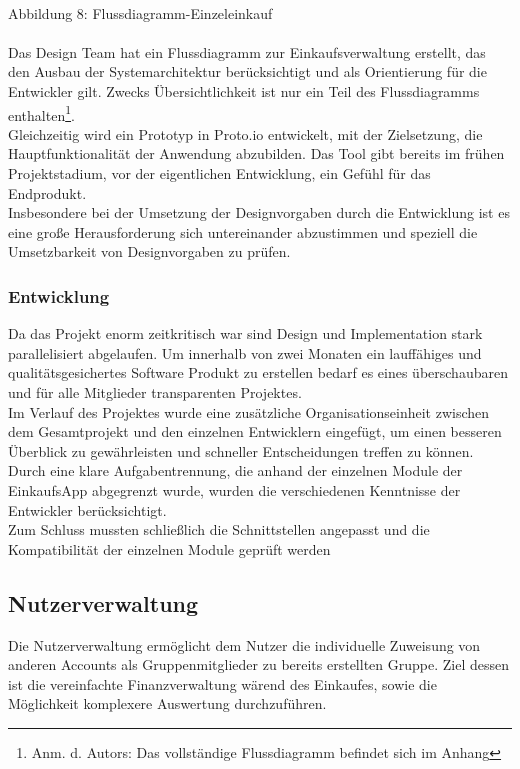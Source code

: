 \documentclass[12pt,a4paper]{article}
\begin{document}
\\
\footnotesize Abbildung 8: Flussdiagramm-Einzeleinkauf
\\
\\
\normalsize
Das Design Team hat ein Flussdiagramm zur Einkaufsverwaltung erstellt, das den Ausbau der Systemarchitektur berücksichtigt und als Orientierung für die Entwickler gilt. Zwecks Übersichtlichkeit ist nur ein Teil des Flussdiagramms enthalten\footnote {Anm. d. Autors: Das vollständige Flussdiagramm befindet sich im Anhang}. 
\\
Gleichzeitig wird ein Prototyp in Proto.io entwickelt, mit der Zielsetzung, die Hauptfunktionalität der Anwendung abzubilden. Das Tool gibt bereits im frühen Projektstadium, vor der eigentlichen Entwicklung, ein Gefühl für das Endprodukt.
\\
Insbesondere bei der Umsetzung der Designvorgaben durch die Entwicklung ist es eine große Herausforderung sich untereinander abzustimmen und speziell die Umsetzbarkeit von Designvorgaben zu prüfen. 

\subsubsection*{Entwicklung}
Da das Projekt enorm zeitkritisch war sind Design und Implementation stark parallelisiert abgelaufen. Um innerhalb von zwei Monaten ein lauffähiges und qualitätsgesichertes Software Produkt zu erstellen bedarf es eines überschaubaren und für alle Mitglieder transparenten Projektes.
\\
Im Verlauf des Projektes wurde eine zusätzliche Organisationseinheit zwischen dem Gesamtprojekt und den einzelnen Entwicklern eingefügt, um einen besseren Überblick zu gewährleisten und schneller Entscheidungen treffen zu können. 
\\
Durch eine klare Aufgabentrennung, die anhand der einzelnen Module der EinkaufsApp abgegrenzt wurde, wurden die verschiedenen Kenntnisse der Entwickler berücksichtigt. 
\\
Zum Schluss mussten schließlich die Schnittstellen angepasst und die Kompatibilität der einzelnen Module geprüft werden

\newpage
\subsection{Nutzerverwaltung}
Die Nutzerverwaltung ermöglicht dem Nutzer die individuelle Zuweisung von anderen Accounts als Gruppenmitglieder zu bereits erstellten Gruppe. Ziel dessen ist die vereinfachte Finanzverwaltung wärend des Einkaufes, sowie die Möglichkeit komplexere Auswertung durchzuführen.
\end{document}
